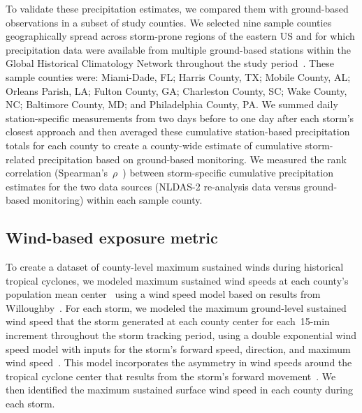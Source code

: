 To validate these precipitation estimates, we compared them with ground-based
observations in a subset of study counties. We selected nine sample counties
geographically spread across storm-prone regions of the eastern \ac{US} and for
which precipitation data were available from multiple ground-based stations
within the Global Historical Climatology Network throughout the study
period~\parencite{menne2012overview, rnoaa, countyweather}. These sample
counties were: Miami-Dade, FL; Harris County, TX; Mobile County, AL; Orleans
Parish, LA; Fulton County, GA; Charleston County, SC; Wake County, NC;
Baltimore County, MD; and Philadelphia County, PA. We summed daily
station-specific measurements from two days before to one day after each
storm's closest approach and then averaged these cumulative station-based
precipitation totals for each county to create a county-wide estimate of
cumulative storm-related precipitation based on ground-based monitoring. We
measured the rank correlation (Spearman's~$\rho$~\parencite{spearman1904proof})
between storm-specific cumulative precipitation estimates for the two data
sources (\ac{NLDAS-2} re-analysis data versus ground-based monitoring) within
each sample county.

\subsection*{Wind-based exposure metric}

To create a dataset of county-level maximum sustained winds during historical
tropical cyclones, we modeled maximum sustained wind speeds at each county's
population mean center~\parencite{countycenters} using a wind speed model based
on results from Willoughby~\parencite{willoughby2006parametric}. For each
storm, we modeled the maximum ground-level sustained wind speed that the storm
generated at each county center for each~15-\si{\minute} increment throughout
the storm tracking period, using a double exponential wind speed model with
inputs for the storm's forward speed, direction, and maximum wind
speed~\parencite{willoughby2006parametric, stormwindmodel}. This model
incorporates the asymmetry in wind speeds around the tropical cyclone center
that results from the storm's forward movement~\parencite{phadke2003modeling,
stormwindmodel}. We then identified the maximum sustained surface wind speed in
each county during each storm.

